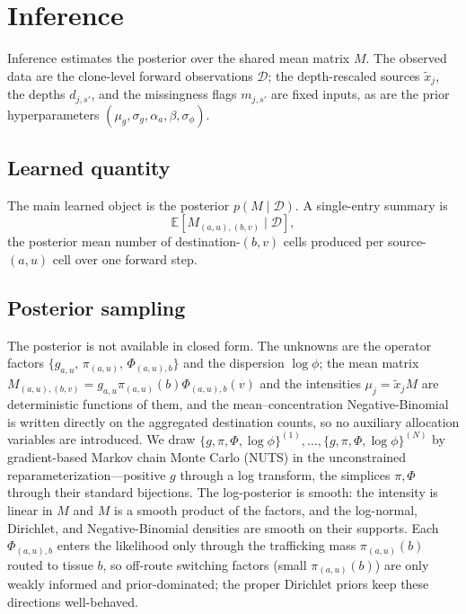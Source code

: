 \documentclass[11pt]{article}
\newcommand{\Dsp}{\mathcal{D}}                    %
\newcommand{\E}{\mathbb{E}}
\theoremstyle{definition}
\begin{document}
\section{Inference}

Inference estimates the posterior over the shared mean matrix $M$. The
observed data are the clone-level forward observations $\Dsp$; the depth-rescaled
sources $\tilde{x}_j$, the depths $d_{j,s'}$, and the missingness flags
$m_{j,s'}$ are fixed inputs, as are the prior hyperparameters
$(\mu_g,\sigma_g,\alpha_a,\beta,\sigma_\phi)$.

\subsection{Learned quantity}

The main learned object is the posterior $p(M \mid \Dsp)$. A single-entry
summary is
\[
  \E\!\left[ M_{(a,u),(b,v)} \mid \Dsp \right],
\]
the posterior mean number of destination-$(b,v)$ cells produced per
source-$(a,u)$ cell over one forward step.

\subsection{Posterior sampling}
\label{sec:posterior-sampling}

The posterior is not available in closed form. The unknowns are the operator
factors $\{g_{a,u},\,\pi_{(a,u)},\,\Phi_{(a,u),b}\}$ and the dispersion $\log\phi$;
the mean matrix $M_{(a,u),(b,v)}=g_{a,u}\pi_{(a,u)}(b)\Phi_{(a,u),b}(v)$ and the
intensities $\mu_j=\tilde{x}_j M$ are deterministic functions of them, and the
mean--concentration Negative-Binomial is written directly on the aggregated
destination counts, so no auxiliary allocation variables are introduced. We draw
$\{g,\pi,\Phi,\log\phi\}^{(1)},\ldots,\{g,\pi,\Phi,\log\phi\}^{(N)}$ by gradient-based
Markov chain Monte Carlo (NUTS) in the unconstrained reparameterization---positive
$g$ through a log transform, the simplices $\pi,\Phi$ through their standard
bijections. The log-posterior is smooth: the intensity is linear in $M$ and $M$ is
a smooth product of the factors, and the log-normal, Dirichlet, and
Negative-Binomial densities are smooth on their supports. Each $\Phi_{(a,u),b}$
enters the likelihood only through the trafficking mass $\pi_{(a,u)}(b)$ routed to
tissue $b$, so off-route switching factors (small $\pi_{(a,u)}(b)$) are only weakly
informed and prior-dominated; the proper Dirichlet priors keep these directions
well-behaved.
\end{document}
